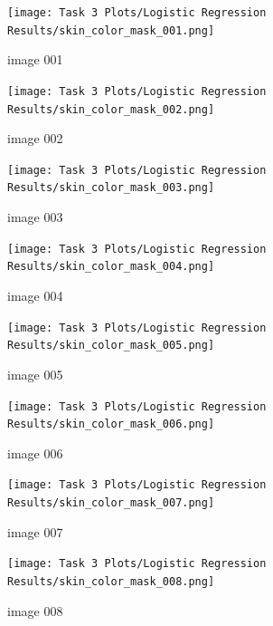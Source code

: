 \documentclass[11pt]{report}
\begin{document}
\begin{figure}
    \centering
    \begin{subfigure}{0.24\textwidth}
        \centering
        \texttt{[image: Task 3 Plots/Logistic Regression Results/skin\_color\_mask\_001.png]}
        \caption{image 001}
        \label{fig:lskincolormask1}
    \end{subfigure}
    \begin{subfigure}{0.24\textwidth}
        \centering
        \texttt{[image: Task 3 Plots/Logistic Regression Results/skin\_color\_mask\_002.png]}
        \caption{image 002}
        \label{fig:lskincolormask2}
    \end{subfigure}
    \begin{subfigure}{0.24\textwidth}
        \centering
        \texttt{[image: Task 3 Plots/Logistic Regression Results/skin\_color\_mask\_003.png]}
        \caption{image 003}
        \label{fig:lskincolormask3}
    \end{subfigure}
    \begin{subfigure}{0.24\textwidth}
        \centering
        \texttt{[image: Task 3 Plots/Logistic Regression Results/skin\_color\_mask\_004.png]}
        \caption{image 004}
        \label{fig:lskincolormask4}
    \end{subfigure}
    \begin{subfigure}{0.24\textwidth}
        \centering
        \texttt{[image: Task 3 Plots/Logistic Regression Results/skin\_color\_mask\_005.png]}
        \caption{image 005}
        \label{fig:lskincolormask5}
    \end{subfigure}
    \begin{subfigure}{0.24\textwidth}
        \centering
        \texttt{[image: Task 3 Plots/Logistic Regression Results/skin\_color\_mask\_006.png]}
        \caption{image 006}
        \label{fig:lskincolormask6}
    \end{subfigure}
    \begin{subfigure}{0.24\textwidth}
        \centering
        \texttt{[image: Task 3 Plots/Logistic Regression Results/skin\_color\_mask\_007.png]}
        \caption{image 007}
        \label{fig:lskincolormask7}
    \end{subfigure}
    \begin{subfigure}{0.24\textwidth}
        \centering
        \texttt{[image: Task 3 Plots/Logistic Regression Results/skin\_color\_mask\_008.png]}
        \caption{image 008}
        \label{fig:lskincolormask8}
    \end{subfigure}
    \begin{subfigure}{0.24\textwidth}

\end{subfigure}
\end{figure}
\end{document}
